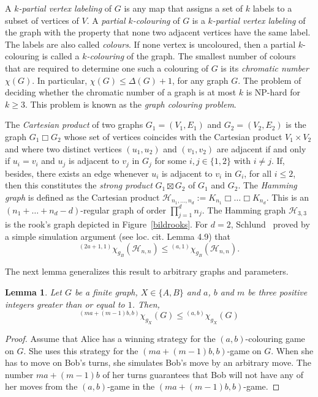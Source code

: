 \documentclass{article}
\newtheorem{lem}[thm]{Lemma}
\newcommand{\gcn}[4]{\ensuremath{{}^{({#1},{#2})}\chi_{g#4}({#3})}}
\newcommand{\gcnb}[3]{\ensuremath{\gcn{#1}{#2}{#3}{_B}}}
\begin{document}
A {\em $k$-partial vertex labeling} of $G$  is any map that assigns a set of $k$ labels to a subset of vertices of $V$. A {\em partial $k$-colouring} of $G$ is a {\em $k$-partial 
vertex labeling} of the graph 
with the property that
none two adjacent vertices have the same label. 
The labels are also called \emph{colours}.
If none vertex is uncoloured, then a partial $k$-colouring is called a {\em 
 $k$-colouring} of the graph. The smallest number of colours that are required to determine one such a colouring of $G$ is its {\em chromatic number} $\chi(G)$. In particular, $\chi(G)\leq \Delta(G)+1$, for any graph 
 $G$. 
The problem of deciding whether the chromatic number of a graph is at most $k$ is NP-hard for $k\ge3$.
This problem is known as the {\em graph colouring problem}.

\pagebreak[4]

 The {\em Cartesian product} of two graphs $G_1=(V_1,E_1)$ and $G_2=(V_2,E_2)$ is the graph $G_1\Box G_2$ whose set of vertices coincides with the Cartesian product $V_1 \times V_2$ and where two distinct vertices 
 $(u_1,u_2)$ and $(v_1,v_2)$ are adjacent if and only if $u_i=v_i$ and $u_j$ is adjacent to $v_j$ in $G_j$ for some $i,j\in\{1,2\}$ with $i\neq j$. If, besides, there exists an 
edge whenever $u_i$ is adjacent to $v_i$ 
 in $G_i$, for all $i\leq 2$, then this constitutes the {\em strong product} $G_1\boxtimes G_2$ of $G_1$ and $G_2$. The {\em Hamming graph} is defined as the Cartesian product $\mathcal{H}_{n_1,\ldots,n_d}:=K_{n_1}\Box 
\ldots\Box K_{n_d}$. This is an $(n_1+\ldots+n_d-d)$-regular graph of order $\prod_{j=1}^dn_j$. The Hamming graph $\mathcal{H}_{3,3}$ is the rook's graph depicted in Figure~\ref{bildrooks}. For $d=2$, 
Schlund~\cite{Schlund2011} proved by a simple simulation argument (see loc. cit. Lemma 4.9) that
\[\gcnb{2a+1}{1}{\mathcal{H}_{n,n}}\le\gcnb{a}{1}{\mathcal{H}_{n,n}}.\]

The next lemma generalizes this result to arbitrary graphs and parameters.

\begin{lem}\label{lem0} Let $G$ be a finite graph, $X\in\{A,B\}$ and $a$, $b$ and $m$ be three positive integers greater than or equal to $1$. Then,
\[{}^{(ma+(m-1)b,b)}\chi_{g_X}(G)\leq {}^{(a,b)}\chi_{g_X}(G)\]
\end{lem}

\begin{proof} Assume that Alice has a winning strategy for the $(a,b)$-colouring game on $G$. She uses this strategy for the
$(ma+(m-1)b,b)$-game on $G$. When she has to move on Bob's turns, she simulates Bob's move by an arbitrary move.
The number $ma+(m-1)b$ of her turns guarantees that Bob will not have any of her moves from the $(a,b)$-game in the $(ma+(m-1)b,b)$-game.
\end{proof}
\end{document}
